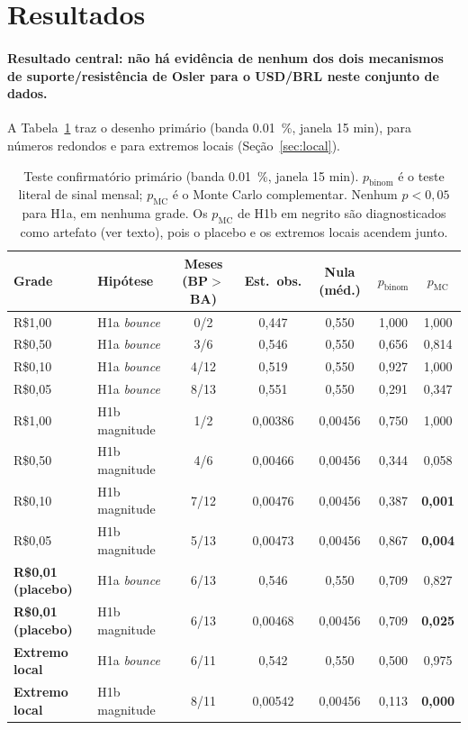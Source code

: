 \documentclass[11pt,a4paper]{article}
\begin{document}
\section{Resultados}

\paragraph{Resultado central: não há evidência de nenhum dos dois mecanismos de
suporte/resistência de Osler para o USD/BRL neste conjunto de dados.} A Tabela~\ref{tab:main}
traz o desenho primário (banda \SI{0.01}{\percent}, janela 15 min), para números redondos e
para extremos locais (Seção~\ref{sec:local}).

\begin{table}[htbp]
  \centering
  \caption{Teste confirmatório primário (banda \SI{0.01}{\percent}, janela 15 min).
  $p_{\text{binom}}$ é o teste literal de sinal mensal; $p_{\text{MC}}$ é o Monte Carlo
  complementar. Nenhum $p<0{,}05$ para H1a, em nenhuma grade. Os $p_{\text{MC}}$ de H1b em
  negrito são diagnosticados como artefato (ver texto), pois o placebo e os extremos locais
  acendem junto.}
  \label{tab:main}
  \small
  \begin{tabular}{llccccc}
    \toprule
    Grade & Hipótese & Meses (BP$>$BA) & Est.\ obs. & Nula (méd.) & $p_{\text{binom}}$ & $p_{\text{MC}}$ \\
    \midrule
    R\$1,00 & H1a \emph{bounce}    & 0/2  & 0,447 & 0,550 & 1,000 & 1,000 \\
    R\$0,50 & H1a \emph{bounce}    & 3/6  & 0,546 & 0,550 & 0,656 & 0,814 \\
    R\$0,10 & H1a \emph{bounce}    & 4/12 & 0,519 & 0,550 & 0,927 & 1,000 \\
    R\$0,05 & H1a \emph{bounce}    & 8/13 & 0,551 & 0,550 & 0,291 & 0,347 \\
    \addlinespace
    R\$1,00 & H1b magnitude        & 1/2  & 0,00386 & 0,00456 & 0,750 & 1,000 \\
    R\$0,50 & H1b magnitude        & 4/6  & 0,00466 & 0,00456 & 0,344 & 0,058 \\
    R\$0,10 & H1b magnitude        & 7/12 & 0,00476 & 0,00456 & 0,387 & \textbf{0,001} \\
    R\$0,05 & H1b magnitude        & 5/13 & 0,00473 & 0,00456 & 0,867 & \textbf{0,004} \\
    \addlinespace
    \textbf{R\$0,01 (placebo)} & H1a \emph{bounce} & 6/13 & 0,546 & 0,550 & 0,709 & 0,827 \\
    \textbf{R\$0,01 (placebo)} & H1b magnitude     & 6/13 & 0,00468 & 0,00456 & 0,709 & \textbf{0,025} \\
    \addlinespace
    \textbf{Extremo local} & H1a \emph{bounce} & 6/11 & 0,542 & 0,550 & 0,500 & 0,975 \\
    \textbf{Extremo local} & H1b magnitude     & 8/11 & 0,00542 & 0,00456 & 0,113 & \textbf{0,000} \\
    \bottomrule
  \end{tabular}
\end{table}
\end{document}
